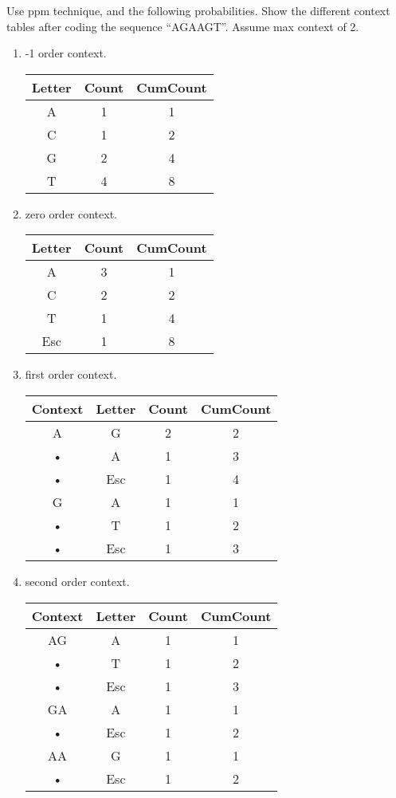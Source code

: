
\begin{question}
Use ppm technique, and the following probabilities. Show the different context tables after coding the sequence “AGAAGT”. Assume max context of 2.

\end{question}
\begin{solution}
\begin{enumerate}
\item -1 order context. \\
\begin{tabular}{|c|c|c|}
\hline 
Letter  & Count & CumCount \\ 
\hline 
A & 1 & 1 \\ 
\hline 
C & 1 & 2 \\ 
\hline 
G & 2 & 4 \\ 
\hline 
T & 4 & 8 \\ 
\hline 
\end{tabular} 
\item zero order context. \\
\begin{tabular}{|c|c|c|}
\hline 
Letter  & Count & CumCount \\ 
\hline 
A & 3 & 1 \\ 
\hline 
C & 2 & 2 \\ 
\hline 
T & 1 & 4 \\ 
\hline 
Esc & 1 & 8 \\ 
\hline 
\end{tabular} 
\item first order context. \\
\begin{tabular}{|c|c|c|c|}
\hline 
Context & Letter & Count & CumCount \\ 
\hline 
A & G & 2 & 2 \\ 
\hline 
• & A & 1 & 3 \\ 
\hline 
• & Esc & 1 & 4 \\ 
\hline 
G & A & 1 & 1 \\ 
\hline 
• & T & 1 & 2 \\ 
\hline 
• & Esc & 1 & 3 \\ 
\hline 
\end{tabular} 
\item second order context. \\
\begin{tabular}{|c|c|c|c|}
\hline 
Context & Letter & Count & CumCount \\ 
\hline 
AG & A & 1 & 1 \\ 
\hline 
• & T & 1 & 2 \\ 
\hline 
• & Esc & 1 & 3 \\ 
\hline 
GA & A & 1 & 1 \\ 
\hline 
• & Esc & 1 & 2 \\ 
\hline 
AA & G & 1 & 1 \\ 
\hline 
• & Esc & 1 & 2 \\ 
\hline \hline 

\end{tabular} 


\end{enumerate}
\end{solution}

